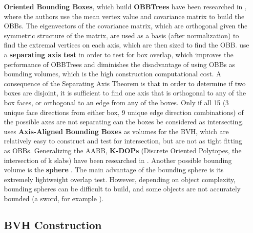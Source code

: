 

\textbf{Oriented Bounding Boxes}, which build \textbf{OBBTrees} have been researched in \citep{gott96}, where the authors use the mean vertex value and covariance matrix to build the OBBs. The eigenvectors of the covariance matrix, which are orthogonal given the symmetric structure of the matrix, are used as a basis (after normalization) to find the extremal vertices on each axis, which are then sized to find the OBB.
\citep{gott96} use a \textbf{separating axis test} in order to test for box overlap, which improves the performance of OBBTrees and diminishes the disadvantage of using OBBs as bounding volumes, which is the high construction computational cost. A consequence of the Separating Axis Theorem is that in order to determine if two boxes are disjoint, it is sufficient to find one axis that is orthogonal to any of the box faces, or orthogonal to an edge from any of the boxes. Only if all 15 (3 unique face directions from either box, 9 unique edge direction combinations) of the possible axes are not separating can the boxes be considered as intersecting. \citep{vdb97} uses \textbf{Axis-Aligned Bounding Boxes} as volumes for the BVH, which are relatively easy to construct and test for intersection, but are not as tight fitting as OBBs. Generalizing the AABB, \textbf{K-DOPs} (Discrete Oriented Polytopes, the intersection of k slabs) have been researched in \citep{klo98}. Another possible bounding volume is the \textbf{sphere} \citep{hub96, rtsd01}. The main advantage of the bounding sphere is its extremely lightweight overlap test. However, depending on object complexity, bounding spheres can be difficult to build, and some objects are not accurately bounded (a sword, for example \citep{rtcd}).

\subsection{BVH Construction}
\label{sub-sec:bvhconstruction}

